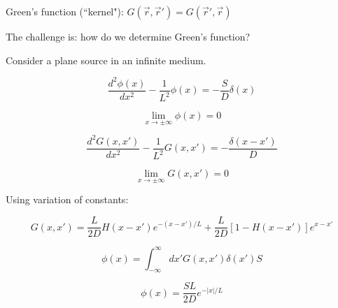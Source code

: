\documentclass[12pt]{article}
\newcommand{\rvec}{\ensuremath{\vec{r}}}
\begin{document}
Green's function (``kernel"): $G(\rvec,\rvec') = G(\rvec',\rvec)$


The challenge is: how do we determine Green's function?


Consider a plane source in an infinite medium.

\begin{equation*}
\frac{d^2\phi(x)}{dx^2} - \frac{1}{L^2}\phi(x) = -\frac{S}{D}\delta(x)
\end{equation*}

\begin{equation*}
\lim\limits_{x\to\pm\infty}\phi(x) = 0
\end{equation*}

\begin{equation*}
\frac{d^2 G(x,x')}{dx^2} - \frac{1}{L^2}G(x,x') = -\frac{\delta(x-x')}{D}
\end{equation*}

\begin{equation*}
\lim\limits_{x\to\pm\infty}G(x,x') = 0
\end{equation*}

Using variation of constants:

\begin{equation*}
G(x,x') = \frac{L}{2D}H(x-x')e^{-(x-x')/L} + \frac{L}{2D}[1-H(x-x')]e^{x-x'}
\end{equation*}

\begin{equation*}
\phi(x) = \int_{-\infty}^{\infty}dx'G(x,x')\delta(x')S
\end{equation*}

\begin{equation*}
\phi(x) = \frac{SL}{2D}e^{-|x|/L}
\end{equation*}
\end{document}
